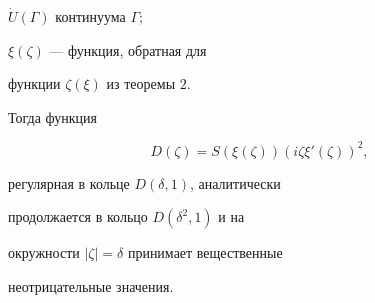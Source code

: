 \begin{lem}
$\Dot{U}(\Gamma)$ континуума $\Gamma;$


$\xi(\zeta)$ --- функция, обратная для  


функции $\zeta(\xi)$ из теоремы $2$.





Тогда функция 


\begin{equation}


D(\zeta)=S(\xi(\zeta))(i\zeta \xi'(\zeta))^{2},


\end{equation}


регулярная в кольце $D(\delta,1)$, аналитически 


продолжается в кольцо $D(\delta^{2},1)$ и на


окружности $|\zeta|=\delta$ принимает вещественные


неотрицательные значения.


\end{lem}


\setcounter{footnote}{0}





